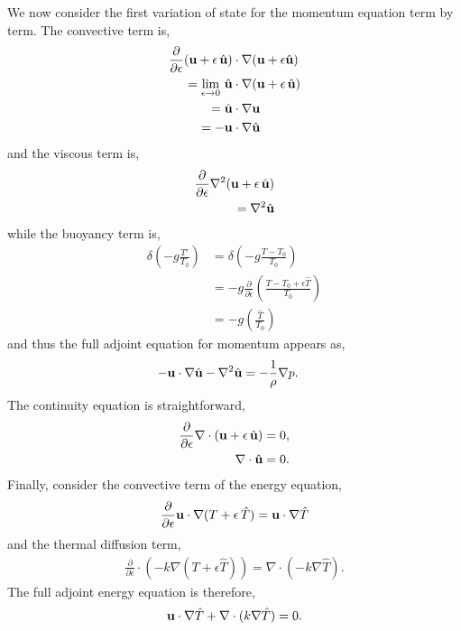 We now consider the first variation of state for the momentum equation
term by term. The convective term is, 
\begin{align}
 \frac{\partial}{\partial \epsilon} ({\bf u} + \epsilon \, \hat {\bf u}) &\cdot \nabla
  ({\bf u} + \epsilon \hat {\bf u}) \\
 = \lim_{\epsilon \to 0} \, \hat {\bf u} &\cdot \nabla ({\bf u} + \epsilon \,\hat {\bf u}) \\
 = \hat {\bf u} & \cdot \nabla {\bf u} \\
 = - {\bf u} &\cdot \nabla \hat {\bf u}
\end{align}
and the viscous term is, 
\begin{align}
 \frac{\partial}{\partial \epsilon} \nabla^2 ({\bf u} + \epsilon \, \hat {\bf u}) \\
 = \nabla^2 \hat {\bf u}
\end{align}
while the buoyancy term is, 
\begin{align}
 \delta \left(-g \frac{T'}{T_0}\right) &= \delta \left( -g
 \frac{T-T_0}{T_0} \right) \\
 &= -g \frac{\partial}{\partial \epsilon} \left( \frac{T-T_0+\epsilon
 \hat T}{T_0} \right) \\
 &= -g \left( \frac{\hat T}{T_0} \right) 
\end{align}
%
%
and thus the full adjoint equation for momentum appears as,
\begin{align}
 - {\bf u} &\cdot \nabla \hat {\bf u} - \nabla^2 \hat {\bf u} = -\frac{1}{\rho} \nabla p. 
\label{eq_adjmom}
\end{align}
%
The continuity equation is straightforward, 
\begin{align}
 \frac{\partial}{\partial \epsilon} \nabla \cdot ({\bf u} + \epsilon \,
 \hat {\bf u}) &= 0, \\
\nabla \cdot \hat {\bf u} &= 0.
\label{eq_adjcont}
\end{align}
%
Finally, consider the convective term of the energy equation, 
\begin{align}
 \frac{\partial}{\partial \epsilon} {\bf u} \cdot \nabla (T + \epsilon
 \, \hat T)
 = {\bf u} \cdot \nabla \hat T
\end{align}
and the thermal diffusion term, 
\begin{align}
 \frac{\partial}{\partial \epsilon} \cdot (-k \nabla (T + \epsilon \hat
 T)) = \nabla \cdot (-k \nabla \hat T).
\end{align}
The full adjoint energy equation is therefore, 
\begin{align}
 {\bf u} \cdot \nabla \hat T + \nabla \cdot (k \nabla \hat T) = 0.
\label{eq_adjen}
\end{align}

